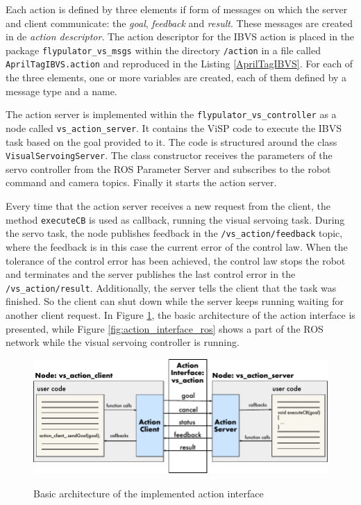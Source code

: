  Each action is defined by three elements if form of messages on which the server and client communicate: the \emph{goal}, \emph{feedback} and \emph{result}. These messages are created in de \emph{action descriptor}. The action descriptor for the IBVS action is placed in the package \texttt{flypulator\_vs\_msgs} within the directory \texttt{/action} in a file called \texttt{AprilTagIBVS.action} and reproduced in the Listing \ref{AprilTagIBVS}. For each of the three elements, one or more variables are created, each of them defined by a message type and a name.


The action server is implemented within the \texttt{flypulator\_vs\_controller} as a node called \texttt{vs\_action\_server}. It contains the ViSP code to execute the IBVS task based on the goal provided to it. The code is structured around the class \texttt{VisualServoingServer}. The class constructor receives the parameters of the servo controller from the ROS Parameter Server and subscribes to the robot command and camera topics. Finally it starts the action server.

Every time that the action server receives a new request from the client, the method \texttt{executeCB} is used as callback, running the visual servoing task. During the servo task, the node publishes feedback in the \texttt{/vs\_action/feedback} topic, where the feedback is in this case the current error of the control law. When the tolerance of the control error has been achieved, the control law stops the robot and terminates and the server publishes the last control error in the \texttt{/vs\_action/result}. Additionally, the server tells the client that the task was finished. So the client can shut down while the server keeps running waiting for another client request. In Figure \ref{fig:action_interface}, the basic architecture of the action interface is presented, while Figure \ref{fig:action_interface_ros} shows a part of the ROS network while the visual servoing controller is running.

\begin{figure}[!htb]
	\caption{Basic architecture of the implemented action interface}
	\centering
	\includegraphics[width=\textwidth]{content/chapter_05/images/action_interface.pdf}
	\label{fig:action_interface}
\end{figure}

